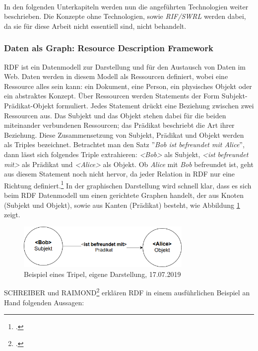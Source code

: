 \documentclass[12pt,a4paper]{article}
\begin{document}
\\
In den folgenden Unterkapiteln werden nun die angeführten Technologien weiter beschrieben. Die Konzepte ohne Technologien, sowie \textit{RIF/SWRL} werden dabei, da sie für diese Arbeit nicht essentiell sind, nicht behandelt.


\subsubsection{Daten als Graph: Resource Description Framework}

RDF ist ein Datenmodell zur Darstellung und für den Austausch von Daten im Web. Daten werden in diesem Modell als Ressourcen definiert, wobei eine Ressource alles sein kann: ein Dokument, eine Person, ein physisches Objekt oder ein abstraktes Konzept. Über Ressourcen werden Statements der Form Subjekt-Prädikat-Objekt formuliert. Jedes Statement drückt eine Beziehung zwischen zwei Ressourcen aus. Das Subjekt und das Objekt stehen dabei für die beiden miteinander verbundenen Ressourcen; das Prädikat beschriebt die Art ihrer Beziehung. Diese Zusammensetzung von Subjekt, Prädikat und Objekt werden als Triples bezeichnet. Betrachtet man den Satz ''\textit{Bob ist befreundet mit Alice}'', dann lässt sich folgendes Triple extrahieren: \textit{<Bob>} als Subjekt, \textit{<ist befreundet mit>} als Prädikat und \textit{<Alice>} als Objekt. Ob \textit{Alice} mit \textit{Bob} befreundet ist, geht aus diesem Statement noch nicht hervor, da jeder Relation in RDF nur eine Richtung definiert.\footcite[Vgl.][S.16-21]{powers2003practical} In der graphischen Darstellung wird schnell klar, dass es sich beim RDF Datenmodell um einen gerichtete Graphen handelt, der aus Knoten (Subjekt und Objekt), sowie aus Kanten (Prädikat) besteht, wie Abbildung \ref{fig:triple} zeigt.
\begin{figure}[H]
  \centering
	\includegraphics[width=0.75\textwidth]{img/triple.png}  
    \caption[Beispiel eines Tripel]{Beispiel eines Tripel, eigene Darstellung, 17.07.2019}
  	\label{fig:triple}
\end{figure}
SCHREIBER und RAIMOND\footcite[Vgl.][]{schreiber2014rdf} erklären RDF in einem ausführlichen Beispiel an Hand folgenden Aussagen:
\end{document}
